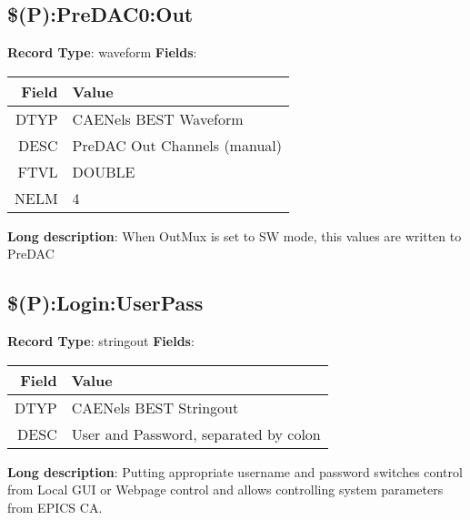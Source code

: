 \subsection{\$(P):PreDAC0:Out}
\textbf{Record Type}: waveform \newline \newline 
\textbf{Fields}: \newline 
\begin{tabularx}{0.7\linewidth}{|r|X|}
\hline Field & Value \\
\hline
\hline
DTYP & CAENels BEST Waveform\\
\hline
DESC & PreDAC Out Channels (manual)\\
\hline
FTVL & DOUBLE\\
\hline
NELM & 4\\
\hline
\end{tabularx}
\newline \newline \newline
\textbf{Long description}: \newline 
 When OutMux is set to SW mode, this values are written to PreDAC
\newline \newline


\subsection{\$(P):Login:UserPass}
\textbf{Record Type}: stringout \newline \newline 
\textbf{Fields}: \newline 
\begin{tabularx}{0.7\linewidth}{|r|X|}
\hline Field & Value \\
\hline
\hline
DTYP & CAENels BEST Stringout\\
\hline
DESC & User and Password, separated by colon\\
\hline
\end{tabularx}
\newline \newline \newline
\textbf{Long description}: \newline 
 Putting appropriate username and password switches control from Local GUI or Webpage control and allows controlling system parameters from EPICS CA.
\newline \newline


